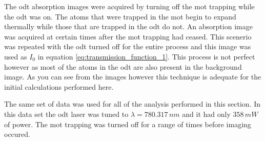 The \gls{odt} absorption images were acquired by turning off the \gls{mot} trapping while the \gls{odt} was on. The atoms that were trapped in the \gls{mot} begin to expand thermally while those that are trapped in the \gls{odt} do not. An absorption image was acquired at certain times after the \gls{mot} trapping had ceased. This scenerio was repeated with the \gls{odt} turned off for the entire process and this image was used as $I_0$ in equation \ref{eq:transmission_function_1}. This process is not perfect however as most of the atoms in the \gls{odt} are also present in the background image. As you can see from the images however this technique is adequate for the initial calculations performed here.

The same set of data was used for all of the analysis performed in this section. In this data set the \gls{odt} laser was tuned to $\lambda=780.317\,\unit{nm}$ and it had only $358\,\unit{mW}$ of power. The \gls{mot} trapping was turned off for a range of times before imaging occured.

